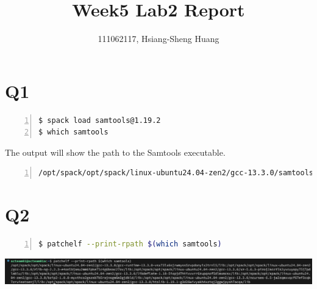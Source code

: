 \documentclass{article}
\title{Week5 Lab2 Report}
\author{111062117, Hsiang-Sheng Huang}
\begin{document}
\maketitle

\section*{Q1}
\begin{lstlisting}[language=bash, basicstyle=\ttfamily\small, numbers=left, numberstyle=\tiny\color{gray}, stepnumber=1, frame=single, breaklines=true, breakatwhitespace=false]
$ spack load samtools@1.19.2
$ which samtools
\end{lstlisting}

The output will show the path to the Samtools executable.
\begin{lstlisting}[language=bash, basicstyle=\ttfamily\small, numbers=left, numberstyle=\tiny\color{gray}, stepnumber=1, frame=single, breaklines=true, breakatwhitespace=false]
/opt/spack/opt/spack/linux-ubuntu24.04-zen2/gcc-13.3.0/samtools-1.19.2-lyfbbdw5hdad4e7pao3waqhawxb5a7gb/bin/samtools
\end{lstlisting}

\section*{Q2}

\begin{lstlisting}[language=bash, basicstyle=\ttfamily\small, numbers=left, numberstyle=\tiny\color{gray}, stepnumber=1, frame=single, breaklines=true, breakatwhitespace=false]
$ patchelf --print-rpath $(which samtools)
\end{lstlisting}

\begin{center}
    \includegraphics[width=1\textwidth]{./img/q2.png}
\end{center}
\end{document}
